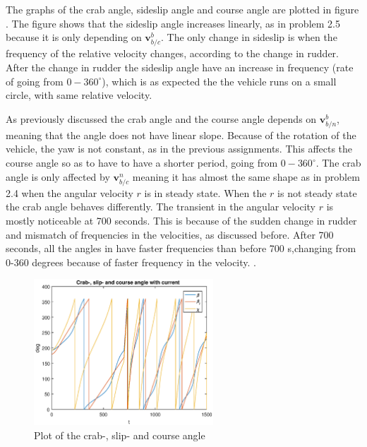 The graphs of the crab angle, sideslip angle and course angle are plotted in figure . The figure shows that the sideslip angle increases linearly, as in problem 2.5 because it is only depending on $\mathbf{v}^b_{b/c}$. The only change in sideslip is when the frequency of the relative velocity changes, according to the change in rudder. After the change in rudder the sideslip angle have an increase in frequency (rate of going from $0 - 360 ^\circ$), which is as expected the the vehicle runs on a small circle, with same relative velocity.

As previously discussed the crab angle and the course angle depends on $\mathbf{v}^b_{b/n}$, meaning that the angle does not have linear slope. Because of the rotation of the vehicle, the yaw is not constant, as in the previous assignments. This affects the course angle so as to have to have a shorter period, going from $0-360^\circ$. The crab angle is only affected by $\mathbf{v}^n_{b/c}$ meaning it has almost the same shape as in problem 2.4 when the angular velocity $r$ is in steady state. When the $r$ is not steady state the crab angle behaves differently. The transient in the angular velocity $r$ is mostly noticeable at 700 seconds. This is because of the sudden change in rudder and mismatch of frequencies in the velocities, as discussed before. After 700 seconds, all the angles in  have faster frequencies than before 700 s,changing from 0-360 degrees because of faster frequency in the velocity.  .

\begin{figure}[!ht]
	\centering
	\includegraphics[width=0.6\textwidth]{figures/2_6_crab_slip_course.eps}
	\caption{Plot of the crab-, slip- and course angle}
	\label{fig:2_6_crab}
\end{figure}